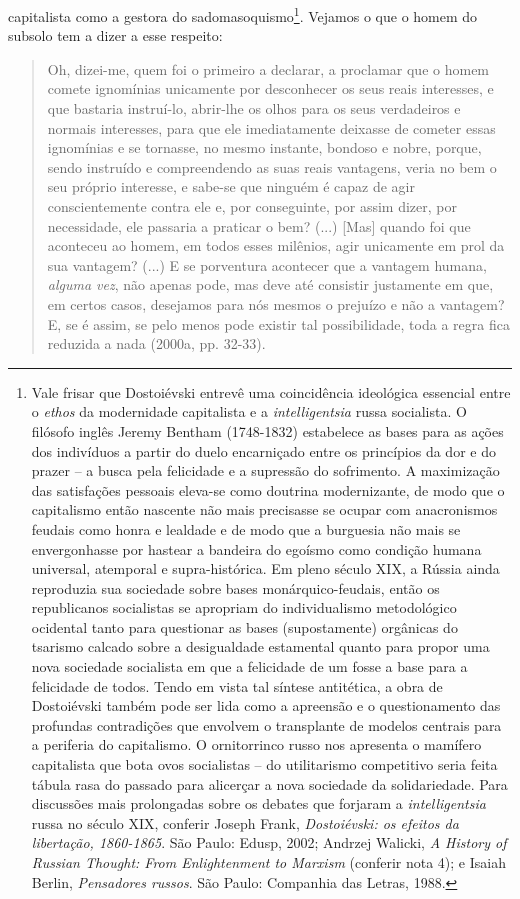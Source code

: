 capitalista como a gestora do sadomasoquismo\footnote{Vale frisar que
  Dostoiévski entrevê uma coincidência ideológica essencial entre o
  \emph{ethos} da modernidade capitalista e a \emph{intelligentsia}
  russa socialista. O filósofo inglês Jeremy Bentham (1748-1832)
  estabelece as bases para as ações dos indivíduos a partir do duelo
  encarniçado entre os princípios da dor e do prazer -- a busca pela
  felicidade e a supressão do sofrimento. A maximização das satisfações
  pessoais eleva-se como doutrina modernizante, de modo que o
  capitalismo então nascente não mais precisasse se ocupar com
  anacronismos feudais como honra e lealdade e de modo que a burguesia
  não mais se envergonhasse por hastear a bandeira do egoísmo como
  condição humana universal, atemporal e supra-histórica. Em pleno
  século XIX, a Rússia ainda reproduzia sua sociedade sobre bases
  monárquico-feudais, então os republicanos socialistas se apropriam do
  individualismo metodológico ocidental tanto para questionar as bases
  (supostamente) orgânicas do tsarismo calcado sobre a desigualdade
  estamental quanto para propor uma nova sociedade socialista em que a
  felicidade de um fosse a base para a felicidade de todos. Tendo em
  vista tal síntese antitética, a obra de Dostoiévski também pode ser
  lida como a apreensão e o questionamento das profundas contradições
  que envolvem o transplante de modelos centrais para a periferia do
  capitalismo. O ornitorrinco russo nos apresenta o mamífero capitalista
  que bota ovos socialistas -- do utilitarismo competitivo seria feita
  tábula rasa do passado para alicerçar a nova sociedade da
  solidariedade. Para discussões mais prolongadas sobre os debates que
  forjaram a \emph{intelligentsia} russa no século XIX, conferir Joseph
  Frank, \emph{Dostoiévski: os efeitos da libertação, 1860-1865}. São
  Paulo: Edusp, 2002; Andrzej Walicki, \emph{A History of Russian
  Thought: From Enlightenment to Marxism} (conferir nota 4); e Isaiah
  Berlin, \emph{Pensadores russos}. São Paulo: Companhia das Letras,
  1988.}. Vejamos o que o homem do subsolo tem a dizer a esse respeito:

\begin{quote}
Oh, dizei-me, quem foi o primeiro a declarar, a proclamar que o homem
comete ignomínias unicamente por desconhecer os seus reais interesses, e
que bastaria instruí-lo, abrir-lhe os olhos para os seus verdadeiros e
normais interesses, para que ele imediatamente deixasse de cometer essas
ignomínias e se tornasse, no mesmo instante, bondoso e nobre, porque,
sendo instruído e compreendendo as suas reais vantagens, veria no bem o
seu próprio interesse, e sabe-se que ninguém é capaz de agir
conscientemente contra ele e, por conseguinte, por assim dizer, por
necessidade, ele passaria a praticar o bem? (...) {[}Mas{]} quando foi
que aconteceu ao homem, em todos esses milênios, agir unicamente em prol
da sua vantagem? (...) E se porventura acontecer que a vantagem humana,
\emph{alguma vez}, não apenas pode, mas deve até consistir justamente em
que, em certos casos, desejamos para nós mesmos o prejuízo e não a
vantagem? E, se é assim, se pelo menos pode existir tal possibilidade,
toda a regra fica reduzida a nada (2000a, pp. 32-33).
\end{quote}

